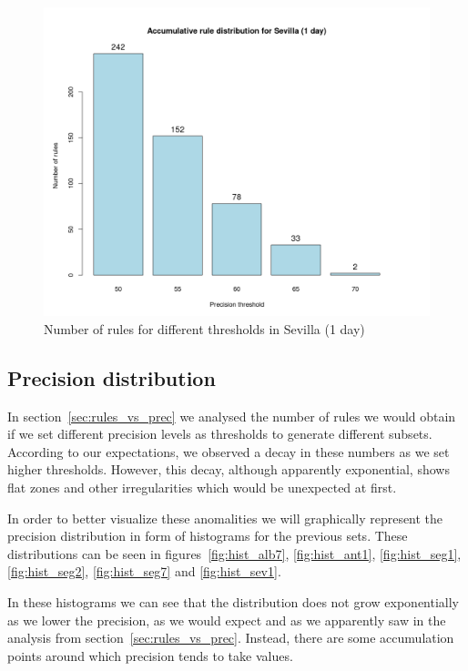 \documentclass[a4paper,12pt]{article}
\begin{document}
\begin{figure}[hbtp]
\includegraphics[width=\textwidth]{img/precision_sev1.png}
\caption{Number of rules for different thresholds in Sevilla (1 day)} \label{fig:precision_sev1}
\end{figure}

\clearpage

\subsection{Precision distribution}
\label{sec:precision_distribution}
In section~\ref{sec:rules_vs_prec} we analysed the number of rules we would obtain if we set different precision levels as thresholds to generate different subsets. According to our expectations, we observed a decay in these numbers as we set higher thresholds. However, this decay, although apparently exponential, shows flat zones and other irregularities which would be unexpected at first.

In order to better visualize these anomalities we will graphically represent the precision distribution in form of histograms for the previous sets. These distributions can be seen in figures~\ref{fig:hist_alb7}, \ref{fig:hist_ant1}, \ref{fig:hist_seg1}, \ref{fig:hist_seg2}, \ref{fig:hist_seg7} and \ref{fig:hist_sev1}.

In these histograms we can see that the distribution does not grow exponentially as we lower the precision, as we would expect and as we apparently saw in the analysis from section~\ref{sec:rules_vs_prec}. Instead, there are some accumulation points around which precision tends to take values. 
\end{document}
